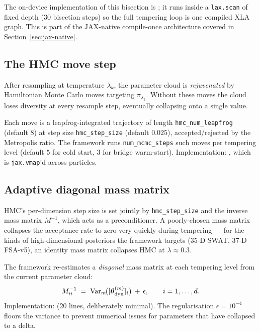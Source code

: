 The on-device implementation of this bisection is
; it runs
inside a \texttt{lax.scan} of fixed depth (30 bisection steps) so the
full tempering loop is one compiled XLA graph. This is part of the
JAX-native compile-once architecture covered in
Section~\ref{sec:jax-native}.

\subsection{The HMC move step}

After resampling at temperature $\lambda_k$, the parameter cloud is
\emph{rejuvenated} by Hamiltonian Monte Carlo moves targeting
$\pi_{\lambda_k}$. Without these moves the cloud loses diversity at
every resample step, eventually collapsing onto a single value.

Each move is a leapfrog-integrated trajectory of length
\texttt{hmc\_num\_leapfrog} (default $8$) at step size
\texttt{hmc\_step\_size} (default $0.025$), accepted/rejected by the
Metropolis ratio. The framework runs \texttt{num\_mcmc\_steps} such
moves per tempering level (default $5$ for cold start, $3$ for bridge
warm-start). Implementation:
, which is
\texttt{jax.vmap}'d across particles.

\subsection{Adaptive diagonal mass matrix} \label{sec:mass-matrix}

HMC's per-dimension step size is set jointly by \texttt{hmc\_step\_size}
and the inverse mass matrix $M^{-1}$, which acts as a preconditioner.
A poorly-chosen mass matrix collapses the acceptance rate to zero very
quickly during tempering --- for the kinds of high-dimensional
posteriors the framework targets (35-D SWAT, 37-D FSA-v5), an
identity mass matrix collapses HMC at $\lambda \approx 0.3$.

The framework re-estimates a \emph{diagonal} mass matrix at each
tempering level from the current parameter cloud:
\begin{equation}
M^{-1}_{ii} \;=\; \mathrm{Var}_m\!\bigl([\bm{\theta}_{\rm dyn}^{(m)}]_i\bigr)
                 \,+\, \epsilon, \qquad i = 1, \ldots, d.
\label{eq:diag-mass}
\end{equation}
Implementation: 
(20 lines, deliberately minimal). The regularisation $\epsilon =
10^{-4}$ floors the variance to prevent numerical issues for
parameters that have collapsed to a delta.

